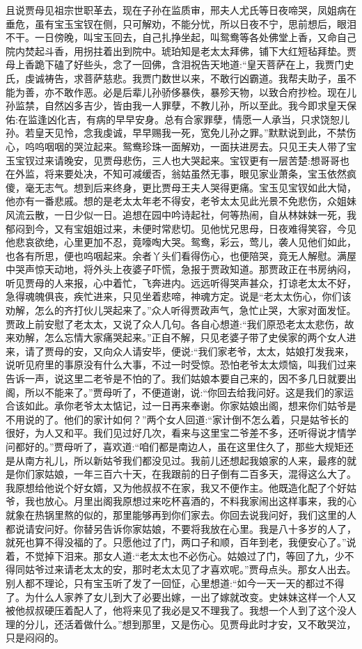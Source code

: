 \begin{parag}
    且说贾母见祖宗世职革去，现在子孙在监质审，邢夫人尤氏等日夜啼哭，凤姐病在垂危，虽有宝玉宝钗在侧，只可解劝，不能分忧，所以日夜不宁，思前想后，眼泪不干。一日傍晚，叫宝玉回去，自己扎挣坐起，叫鸳鸯等各处佛堂上香，又命自己院内焚起斗香，用拐拄着出到院中。琥珀知是老太太拜佛，铺下大红短毡拜垫。贾母上香跪下磕了好些头，念了一回佛，含泪祝告天地道:“皇天菩萨在上，我贾门史氏，虔诚祷告，求菩萨慈悲。我贾门数世以来，不敢行凶霸道。我帮夫助子，虽不能为善，亦不敢作恶。必是后辈儿孙骄侈暴佚，暴殄天物，以致合府抄检。现在儿孙监禁，自然凶多吉少，皆由我一人罪孽，不教儿孙，所以至此。我今即求皇天保佑:在监逢凶化吉，有病的早早安身。总有合家罪孽，情愿一人承当，只求饶恕儿孙。若皇天见怜，念我虔诚，早早赐我一死，宽免儿孙之罪。”默默说到此，不禁伤心，呜呜咽咽的哭泣起来。鸳鸯珍珠一面解劝，一面扶进房去。只见王夫人带了宝玉宝钗过来请晚安，见贾母悲伤，三人也大哭起来。宝钗更有一层苦楚:想哥哥也在外监，将来要处决，不知可减缓否，翁姑虽然无事，眼见家业萧条，宝玉依然疯傻，毫无志气。想到后来终身，更比贾母王夫人哭得更痛。宝玉见宝钗如此大恸，他亦有一番悲戚。想的是老太太年老不得安，老爷太太见此光景不免悲伤，众姐妹风流云散，一日少似一日。追想在园中吟诗起社，何等热闹，自从林妹妹一死，我郁闷到今，又有宝姐姐过来，未便时常悲切。见他忧兄思母，日夜难得笑容，今见他悲哀欲绝，心里更加不忍，竟嚎啕大哭。鸳鸯，彩云，莺儿，袭人见他们如此，也各有所思，便也呜咽起来。余者丫头们看得伤心，也便陪哭，竟无人解慰。满屋中哭声惊天动地，将外头上夜婆子吓慌，急报于贾政知道。那贾政正在书房纳闷，听见贾母的人来报，心中着忙，飞奔进内。远远听得哭声甚众，打谅老太太不好，急得魂魄俱丧，疾忙进来，只见坐着悲啼，神魂方定。说是“老太太伤心，你们该劝解，怎么的齐打伙儿哭起来了。”众人听得贾政声气，急忙止哭，大家对面发怔。贾政上前安慰了老太太，又说了众人几句。各自心想道:“我们原恐老太太悲伤，故来劝解，怎么忘情大家痛哭起来。”正自不解，只见老婆子带了史侯家的两个女人进来，请了贾母的安，又向众人请安毕，便说:“我们家老爷，太太，姑娘打发我来，说听见府里的事原没有什么大事，不过一时受惊。恐怕老爷太太烦恼，叫我们过来告诉一声，说这里二老爷是不怕的了。我们姑娘本要自己来的，因不多几日就要出阁，所以不能来了。”贾母听了，不便道谢，说:“你回去给我问好。这是我们的家运合该如此。承你老爷太太惦记，过一日再来奉谢。你家姑娘出阁，想来你们姑爷是不用说的了。他们的家计如何？”两个女人回道:“家计倒不怎么着，只是姑爷长的很好，为人又和平。我们见过好几次，看来与这里宝二爷差不多，还听得说才情学问都好的。”贾母听了，喜欢道:“咱们都是南边人，虽在这里住久了，那些大规矩还是从南方礼儿，所以新姑爷我们都没见过。我前儿还想起我娘家的人来，最疼的就是你们家姑娘，一年三百六十天，在我跟前的日子倒有二百多天，混得这么大了。我原想给他说个好女婿，又为他叔叔不在家，我又不便作主。他既造化配了个好姑爷，我也放心。月里出阁我原想过来吃杯喜酒的，不料我家闹出这样事来，我的心就象在热锅里熬的似的，那里能够再到你们家去。你回去说我问好，我们这里的人都说请安问好。你替另告诉你家姑娘，不要将我放在心里。我是八十多岁的人了，就死也算不得没福的了。只愿他过了门，两口子和顺，百年到老，我便安心了。”说着，不觉掉下泪来。那女人道:“老太太也不必伤心。姑娘过了门，等回了九，少不得同姑爷过来请老太太的安，那时老太太见了才喜欢呢。”贾母点头。那女人出去。别人都不理论，只有宝玉听了发了一回怔，心里想道:“如今一天一天的都过不得了。为什么人家养了女儿到大了必要出嫁，一出了嫁就改变。史妹妹这样一个人又被他叔叔硬压着配人了，他将来见了我必是又不理我了。我想一个人到了这个没人理的分儿，还活着做什么。”想到那里，又是伤心。见贾母此时才安，又不敢哭泣，只是闷闷的。

\end{parag}

